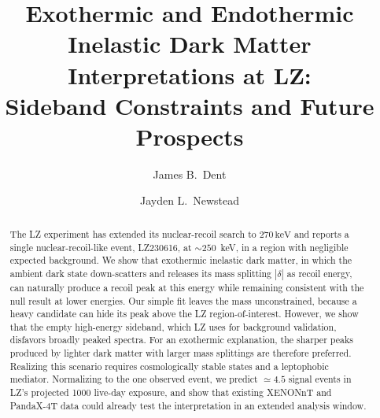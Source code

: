 \documentclass[aps,prl,twocolumn,superscriptaddress,nofootinbib,floatfix,longbibliography]{revtex4-2}
\newcommand{\keV}{\ensuremath{\,\mathrm{keV}}}
\begin{document}
\title{Exothermic and Endothermic  Inelastic Dark Matter Interpretations at LZ: \\
Sideband Constraints and Future Prospects}

\author{James B.~Dent} 

\author{Jayden L.~Newstead}

\begin{abstract}
The LZ experiment has extended its nuclear-recoil search to $270\keV$ and reports a single nuclear-recoil-like event, LZ230616, at $\sim250$~keV, in a region with negligible expected background. We show that exothermic inelastic dark matter, in which the ambient dark state down-scatters and releases its mass splitting $|\delta|$ as recoil energy, can naturally produce a recoil peak at this energy while remaining consistent with the null result at lower energies. Our simple fit leaves the mass unconstrained, because a heavy candidate can hide its peak above the LZ region-of-interest. However, we show that the empty high-energy sideband, which LZ uses for background validation, disfavors broadly peaked spectra. For an exothermic explanation, the sharper peaks produced by lighter dark matter with larger mass splittings are therefore preferred. Realizing this scenario requires cosmologically stable states and a leptophobic mediator. Normalizing to the one observed event, we predict $\simeq4.5$ signal events in LZ's projected 1000 live-day exposure, and show that existing XENONnT and PandaX-4T data could already test the interpretation in an extended analysis window.
\end{abstract}

\maketitle
\end{document}
